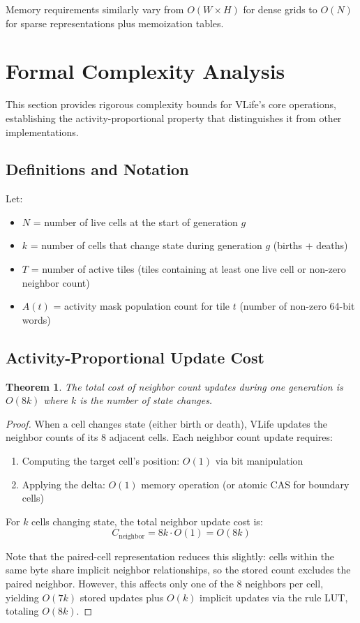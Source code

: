 \documentclass[11pt]{article}
\newtheorem{theorem}{Theorem}[section]
\theoremstyle{definition}
\begin{document}
    Memory requirements similarly vary from $O(W \times H)$ for dense grids to $O(N)$ for sparse representations plus memoization tables.

    \section{Formal Complexity Analysis}

    This section provides rigorous complexity bounds for VLife's core operations, establishing the activity-proportional property that distinguishes it from other implementations.

    \subsection{Definitions and Notation}

    Let:
    \begin{itemize}
        \item $N$ = number of live cells at the start of generation $g$
        \item $k$ = number of cells that change state during generation $g$ (births + deaths)
        \item $T$ = number of active tiles (tiles containing at least one live cell or non-zero neighbor count)
        \item $A(t)$ = activity mask population count for tile $t$ (number of non-zero 64-bit words)
    \end{itemize}

    \subsection{Activity-Proportional Update Cost}

    \begin{theorem}
        The total cost of neighbor count updates during one generation is $O(8k)$ where $k$ is the number of state changes.
    \end{theorem}

    \begin{proof}
        When a cell changes state (either birth or death), VLife updates the neighbor counts of its 8 adjacent cells. Each neighbor count update requires:
        \begin{enumerate}
            \item Computing the target cell's position: $O(1)$ via bit manipulation
            \item Applying the delta: $O(1)$ memory operation (or atomic CAS for boundary cells)
        \end{enumerate}

        For $k$ cells changing state, the total neighbor update cost is:
        \[C_{\text{neighbor}} = 8k \cdot O(1) = O(8k)\]

        Note that the paired-cell representation reduces this slightly: cells within the same byte share implicit neighbor relationships, so the stored count excludes the paired neighbor. However, this affects only one of the 8 neighbors per cell, yielding $O(7k)$ stored updates plus $O(k)$ implicit updates via the rule LUT, totaling $O(8k)$.
    \end{proof}
\end{document}

